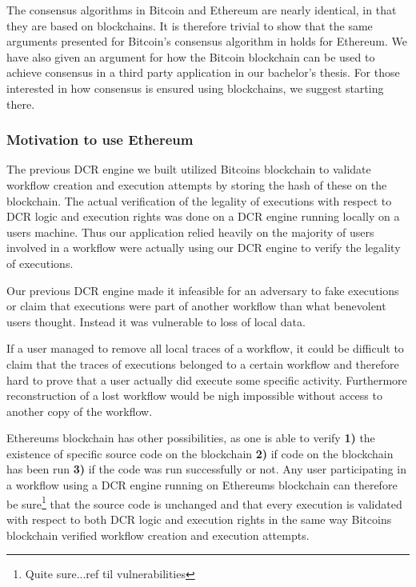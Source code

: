 \documentclass{article}
\begin{document}
			The consensus algorithms in Bitcoin and Ethereum are nearly identical, in that they are based on blockchains. It is therefore trivial to show that the same arguments presented for Bitcoin's consensus algorithm in \cite{anonymous-byzantine-consensus} holds for Ethereum.
			We have also given an argument for how the Bitcoin blockchain can be used to achieve consensus in a third party application in our bachelor's thesis. 
			For those interested in how consensus is ensured using blockchains, we suggest starting there.


			\subsubsection{Motivation to use Ethereum}
			The previous DCR engine we built utilized Bitcoins blockchain to validate workflow creation and execution attempts by storing the hash of these on the blockchain.
			The actual verification of the legality of executions with respect to DCR logic and execution rights was done on a DCR engine running locally on a users machine.
			Thus our application relied heavily on the majority of users involved in a workflow were actually using our DCR engine to verify the legality of executions. 

			Our previous DCR engine made it infeasible for an adversary to fake executions or claim that executions were part of another workflow than what benevolent users thought.
			Instead it was vulnerable to loss of local data. 
			
			If a user managed to remove all local traces of a workflow, it could be difficult to claim that the traces of executions belonged to a certain workflow and therefore hard to prove that a user actually did execute some specific activity. Furthermore reconstruction of a lost workflow would be nigh impossible without access to another copy of the workflow.

			Ethereums blockchain has other possibilities, as one is able to verify \textbf{1)} the existence of specific source code on the blockchain \textbf{2)} if code on the blockchain has been run \textbf{3)} if the code was run successfully or not.
			Any user participating in a workflow using a DCR engine running on Ethereums blockchain can therefore be sure\footnote{Quite sure...ref til vulnerabilities} that the source code is unchanged and that every execution is validated with respect to both DCR logic and execution rights in the same way Bitcoins blockchain verified workflow creation and execution attempts.
\end{document}
